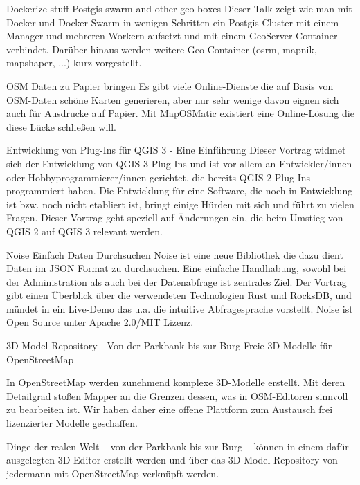 %
{Dockerize stuff}%
{Postgis swarm and other geo boxes}%
{%
Dieser Talk zeigt wie man mit Docker und Docker Swarm in wenigen Schritten ein Postgis-Cluster mit einem Manager und mehreren Workern aufsetzt und mit einem GeoServer-Container verbindet. Darüber hinaus werden weitere Geo-Container (osrm, mapnik, mapshaper, ...) kurz vorgestellt.%
}

%
{OSM Daten zu Papier bringen}%
{}%
{%
Es gibt viele  Online-Dienste die auf Basis von OSM-Daten schöne Karten generieren, aber nur sehr wenige davon eignen sich auch für Ausdrucke auf Papier. Mit MapOSMatic existiert eine Online-Lösung die diese Lücke schließen will.%
}

%
{Entwicklung von Plug-Ins für QGIS 3 - Eine Einführung}%
{}%
{%
Dieser Vortrag widmet sich der Entwicklung von QGIS 3 Plug-Ins und ist vor allem an Entwickler/innen oder Hobbyprogrammierer/innen gerichtet, die bereits QGIS 2 Plug-Ins programmiert haben. Die Entwicklung für eine Software, die noch in Entwicklung ist bzw. noch nicht etabliert ist, bringt einige Hürden mit sich und führt zu vielen Fragen. Dieser Vortrag geht speziell auf Änderungen ein, die beim Umstieg von QGIS 2 auf QGIS 3 relevant werden.%
}

%
{Noise}%
{Einfach Daten Durchsuchen}%
{%
Noise ist eine neue Bibliothek die dazu dient Daten im JSON Format zu durchsuchen. Eine einfache Handhabung, sowohl bei der Administration als auch bei der Datenabfrage ist zentrales Ziel. Der Vortrag gibt einen Überblick über die verwendeten Technologien Rust und RocksDB, und mündet in ein Live-Demo das u.a. die intuitive Abfragesprache vorstellt. Noise ist Open Source unter Apache 2.0/MIT Lizenz.%
}

%
{3D Model Repository - Von der Parkbank bis zur Burg}%
{Freie 3D-Modelle für OpenStreetMap}%
{%
In OpenStreetMap werden zunehmend komplexe 3D-Modelle erstellt. Mit deren Detailgrad stoßen Mapper an die Grenzen dessen, was in OSM-Editoren sinnvoll zu bearbeiten ist. Wir haben daher eine offene Plattform zum Austausch frei lizenzierter Modelle geschaffen.

Dinge der realen Welt – von der Parkbank bis zur Burg – können in einem dafür ausgelegten 3D-Editor erstellt werden und über das 3D Model Repository von jedermann mit OpenStreetMap verknüpft werden.%
}

